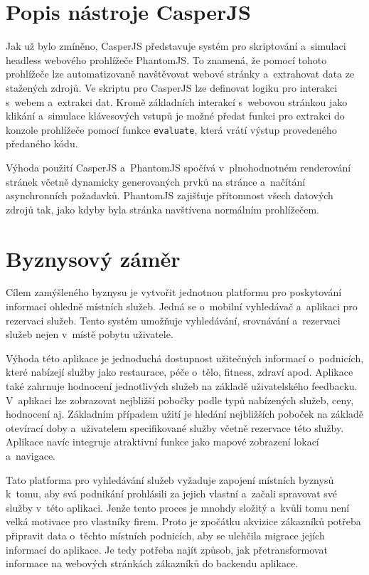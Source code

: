 \documentclass[11pt,a4paper]{article}
\begin{document}
\section{Popis nástroje CasperJS}
Jak už bylo zmíněno, CasperJS představuje systém pro skriptování a~simulaci headless webového prohlížeče PhantomJS. To znamená, že pomocí tohoto prohlížeče lze automatizovaně navštěvovat webové stránky a~extrahovat data ze stažených zdrojů. Ve skriptu pro CasperJS lze definovat logiku pro interakci s~webem a~extrakci dat. Kromě základních interakcí s~webovou stránkou jako klikání a~simulace klávesových vstupů je možné předat funkci pro extrakci do konzole prohlížeče pomocí funkce \texttt{evaluate}, která vrátí výstup provedeného předaného kódu.

Výhoda použití CasperJS a~PhantomJS spočívá v~plnohodnotném renderování stránek včetně dynamicky generovaných prvků na stránce a~načítání asynchronních požadavků. PhantomJS zajišťuje přítomnost všech datových zdrojů tak, jako kdyby byla stránka navštívena normálním prohlížečem.

\section{Byznysový záměr}
Cílem zamýšleného byznysu je vytvořit jednotnou platformu pro poskytování informací ohledně místních služeb. Jedná se o~mobilní vyhledávač a~aplikaci pro rezervaci služeb. Tento systém umožňuje vyhledávání, srovnávání a~rezervaci služeb nejen v~místě pobytu uživatele. 

Výhoda této aplikace je jednoduchá dostupnost užitečných informací o~podnicích, které nabízejí služby jako restaurace, péče o~tělo, fitness, zdraví apod. Aplikace také zahrnuje hodnocení jednotlivých služeb na základě uživatelského feedbacku. V~aplikaci lze zobrazovat nejbližší pobočky podle typů nabízených služeb, ceny, hodnocení aj. Základním případem užití je hledání nejbližších poboček na základě otevírací doby a~uživatelem specifikované služby včetně rezervace této služby. Aplikace navíc integruje atraktivní funkce jako mapové zobrazení lokací a~navigace.

Tato platforma pro vyhledávání služeb vyžaduje zapojení místních byznysů k~tomu, aby svá podnikání prohlásili za jejich vlastní a~začali spravovat své služby v~této aplikaci. Jenže tento proces je mnohdy složitý a~kvůli tomu není velká motivace pro vlastníky firem. Proto je zpočátku akvizice zákazníků potřeba připravit data o~těchto místních podnicích, aby se ulehčila migrace jejích informací do aplikace. Je tedy potřeba najít způsob, jak přetransformovat informace na webových stránkách zákazníků do backendu aplikace.
\end{document}

